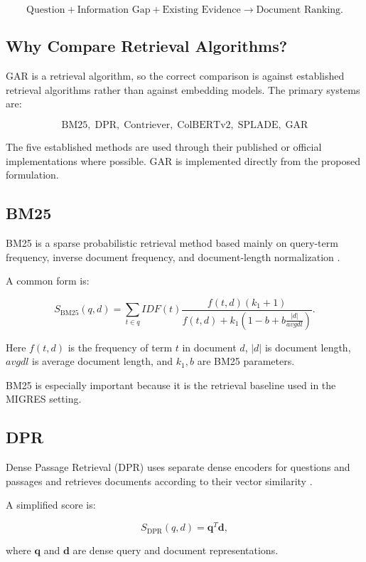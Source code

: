 \documentclass[11pt,a4paper]{article}
\begin{document}
\[
\boxed{
\text{Question}
+
\text{Information Gap}
+
\text{Existing Evidence}
\rightarrow
\text{Document Ranking}.
}
\]

\subsection{Why Compare Retrieval Algorithms?}

GAR is a retrieval algorithm, so the correct comparison is against established retrieval algorithms rather than against embedding models. The primary systems are:

\[
\boxed{
\text{BM25},\;
\text{DPR},\;
\text{Contriever},\;
\text{ColBERTv2},\;
\text{SPLADE},\;
\text{GAR}
}
\]

The five established methods are used through their published or official implementations where possible. GAR is implemented directly from the proposed formulation.

\subsection{BM25}

BM25 is a sparse probabilistic retrieval method based mainly on query-term frequency, inverse document frequency, and document-length normalization \citep{robertson-zaragoza-2009}.

A common form is:

\[
S_{\mathrm{BM25}}(q,d)
=
\sum_{t\in q}
IDF(t)
\frac{
f(t,d)(k_1+1)
}{
f(t,d)+k_1
\left(
1-b+b\frac{|d|}{avgdl}
\right)
}.
\]

Here $f(t,d)$ is the frequency of term $t$ in document $d$, $|d|$ is document length, $avgdl$ is average document length, and $k_1,b$ are BM25 parameters.

BM25 is especially important because it is the retrieval baseline used in the MIGRES setting.

\subsection{DPR}

Dense Passage Retrieval (DPR) uses separate dense encoders for questions and passages and retrieves documents according to their vector similarity \citep{karpukhin-etal-2020-dense}.

A simplified score is:

\[
S_{\mathrm{DPR}}(q,d)
=
\mathbf{q}^{T}\mathbf{d},
\]

where $\mathbf q$ and $\mathbf d$ are dense query and document representations.
\end{document}

